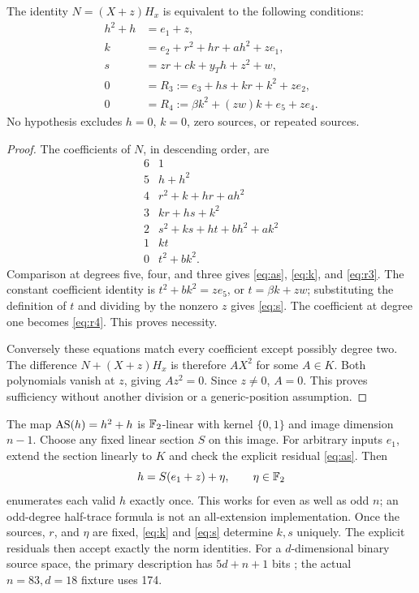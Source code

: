 \begin{theorem}\label{thm:chart}
The identity $N=(X+z)H_x$ is equivalent to the following conditions:
\begin{align}
 h^2+h&=e_1+z,                                             \label{eq:as}\\
 k&=e_2+r^2+hr+ah^2+ze_1,                                 \label{eq:k}\\
 s&=zr+ck+y_Th+z^2+w,                                     \label{eq:s}\\
 0&=R_3:=e_3+hs+kr+k^2+ze_2,                              \label{eq:r3}\\
 0&=R_4:=\beta k^2+(zw)k+e_5+ze_4.                        \label{eq:r4}
\end{align}
No hypothesis excludes $h=0$, $k=0$, zero sources, or repeated sources.
\end{theorem}
\begin{proof}
The coefficients of $N$, in descending order, are
\[
\begin{array}{c|l}
6&1\\
5&h+h^2\\
4&r^2+k+hr+ah^2\\
3&kr+hs+k^2\\
2&s^2+ks+ht+bh^2+ak^2\\
1&kt\\
0&t^2+bk^2 .
\end{array}
\]
Comparison at degrees five, four, and three gives
\eqref{eq:as}, \eqref{eq:k}, and \eqref{eq:r3}.
The constant coefficient identity is $t^2+bk^2=ze_5$, or
$t=\beta k+zw$; substituting the definition of $t$ and dividing by the
nonzero $z$ gives \eqref{eq:s}. The coefficient at degree one becomes
\eqref{eq:r4}. This proves necessity.

Conversely these equations match every coefficient except possibly degree two.
The difference $N+(X+z)H_x$ is therefore $AX^2$ for some $A\in K$.
Both polynomials vanish at $z$, giving $Az^2=0$. Since $z\ne0$, $A=0$.
This proves sufficiency without another division or a generic-position
assumption.
\end{proof}

The map $\operatorname{AS}(h)=h^2+h$ is $\mathbb F_2$-linear with kernel $\{0,1\}$ and
image dimension $n-1$. Choose any fixed linear section $S$ on this image.
For arbitrary inputs $e_1$, extend the section linearly to $K$ and check
the explicit residual \eqref{eq:as}. Then
\[
                  h=S(e_1+z)+\eta,\qquad \eta\in\mathbb F_2
\]
enumerates each valid $h$ exactly once. This works for even as well as odd
$n$; an odd-degree half-trace formula is not an all-extension implementation.
Once the sources, $r$, and $\eta$ are fixed, \eqref{eq:k} and
\eqref{eq:s} determine $k,s$ uniquely. The explicit residuals then accept
exactly the norm identities. For a $d$-dimensional binary source space,
the primary description has $5d+n+1$ bits ; the actual
$n=83,d=18$ fixture uses 174.

